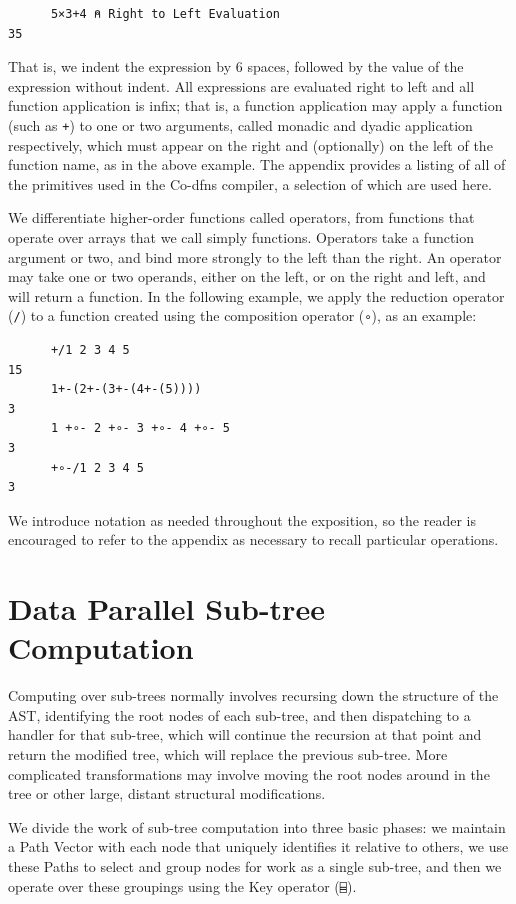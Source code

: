 ﻿\documentclass[numbers,10pt,preprint]{sigplanconf}
\begin{document}
\begin{verbatim}
      5×3+4 ⍝ Right to Left Evaluation
35
\end{verbatim}

\noindent That is, we indent the expression by 6 spaces, followed by the value of the expression without indent. All expressions are evaluated right to left and all function application is infix; that is, a function application may apply a function (such as \verb;+;) to one or two arguments, called monadic and dyadic application respectively, which must appear on the right and (optionally) on the left of the function name, as in the above example. The appendix provides a listing of all of the primitives used in the Co-dfns compiler, a selection of which are used here.

We differentiate higher-order functions called operators, from functions that operate over arrays that we call simply functions. Operators take a function argument or two, and bind more strongly to the left than the right. An operator may take one or two operands, either on the left, or on the right and left, and will return a function. In the following example, we apply the reduction operator (\verb;/;) to a function created using the composition operator (\verb;∘;), as an example:

\begin{verbatim}
      +/1 2 3 4 5
15
      1+-(2+-(3+-(4+-(5))))
3
      1 +∘- 2 +∘- 3 +∘- 4 +∘- 5
3
      +∘-/1 2 3 4 5
3
\end{verbatim}

\noindent We introduce notation as needed throughout the exposition, so the reader is encouraged to refer to the appendix as necessary to recall particular operations.

\section{Data Parallel Sub-tree Computation}

Computing over sub-trees normally involves recursing down the structure of the AST, identifying the root nodes of each sub-tree, and then dispatching to a handler for that sub-tree, which will continue the recursion at that point and return the modified tree, which will replace the previous sub-tree. More complicated transformations may involve moving the root nodes around in the tree or other large, distant structural modifications.

We divide the work of sub-tree computation into three basic phases: we maintain a Path Vector with each node that uniquely identifies it relative to others, we use these Paths to select and group nodes for work as a single sub-tree, and then we operate over these groupings using the Key operator (\verb;⌸;).
\end{document}
